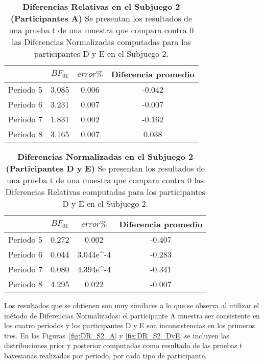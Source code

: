 \begin{table}[h]
\caption[Diferencias Relativas en el Subjuego 2; Participantes A (Pruebas t de una muestra)]{\textbf{Diferencias Relativas en el Subjuego 2 (Participantes A)} Se presentan los resultados de una prueba t de una muestra que compara contra 0 las Diferencias Normalizadas computadas para los participantes D y E en el Subjuego 2.}
\label{DR-S2-A-B}
\centering
\begin{tabular}{l | c c | c}
\toprule
\textbf{} & \textbf{$BF_{01}$} & \textbf{$error\%$} & \textbf{Diferencia promedio}\\
\midrule
Periodo 5 & 3.085 & 0.006 & -0.042\\
Periodo 6 & 3.231 & 0.007 & -0.007\\
Periodo 7 & 1.831 & 0.002 & -0.162\\
Periodo 8 & 3.165 & 0.007 & 0.038\\
\bottomrule
\end{tabular}
\end{table}

\begin{table}[h]
\caption[Diferencias Relativas en el Subjuego 2; Participantes D y E (Pruebas t de una muestra)]{\textbf{Diferencias Normalizadas en el Subjuego 2 (Participantes D y E)} Se presentan los resultados de una prueba t de una muestra que compara contra 0 las Diferencias Relativas computadas para los participantes D y E en el Subjuego 2.}
\label{DR-S2-DyE-B}
\centering
\begin{tabular}{l | c c | c}
\toprule
\textbf{} & \textbf{$BF_{01}$} & \textbf{$error\%$} & \textbf{Diferencia promedio}\\
\midrule
Periodo 5 & 0.272 & 0.002 & -0.407\\
Periodo 6 & 0.044 & 3.044e^-4 & -0.283\\
Periodo 7 & 0.080 & 4.394e^-4 & -0.341\\
Periodo 8 & 4.295 & 0.022 & -0.007\\
\bottomrule
\end{tabular}
\end{table}
  
 Los resultados que se obtienen son muy similares a lo que se observa al utilizar el método de Diferencias Normalizadas: el participante A muestra ser consistente en los cuatro periodos y los participantes D y E son inconsistencias en los primeros tres. En las Figuras~\ref{fig:DR_S2_A} y \ref{fig:DR_S2_DyE} se incluyen las distribuciones prior y posterior computadas como resultado de las pruebas t bayesianas realizadas por periodo, por cada tipo de participante.\\

